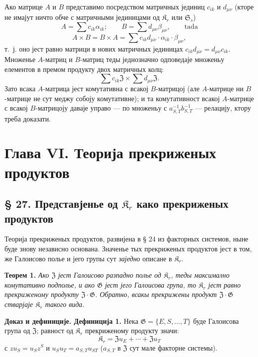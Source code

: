 \documentclass[11pt]{article}
\begin{document}
Ако матрице \(A\) и \(B\) представимо посредством матричных јединиц \(c_{ik}\) и \(d_{\mu\nu}\) (кторе не имајут ничто обче с матричными јединицами од \(\mathfrak K_r\) или \(\mathfrak S_s\))
\[
A=\sum c_{ik}\alpha_{ik};\qquad
B=\sum d_{\mu\nu}\beta_{\mu\nu},\qquad\text{tada}
\]
\[
A\times B=B\times A
=\sum c_{ik}d_{\mu\nu}\cdot\alpha_{ik}\cdot\beta_{\mu\nu},
\]
т.~ј. оно јест равно матрици в нових матричных јединицах
\(c_{ik}d_{\mu\nu}=d_{\mu\nu}c_{ik}\). Множенье \(A\)-матриц и \(B\)-матриц теды једнозначно одповедаје множеньу елементов в премом продукту двох матричных колц:
\[
\sum c_{ik}\mathfrak Z\times\sum d_{\mu\nu}\mathfrak Z.
\]
Зато всака \(A\)-матрица јест комутативна с всакој \(B\)-матрицој (але \(A\)-матрице ни \(B\)-матрице не сут меджу собоју комутативне); и та комутативност всакој \(A\)-матрице с всакој \(B\)-матрицоју даваје управо --- по множеньу с \(a_{S,T}^{-1}b_{S,T}^{-1}\) --- релацију, ктору треба доказати.

\section*{Глава VI. Теорија прекриженых продуктов}\label{kapitel-vi.-theorie-der-verschraenkten-produkte}

\subsection*{§ 27. Представјенье од \(\mathfrak K_r\) како прекриженых продуктов}

Теорија прекриженых продуктов, развијена в § 24 из факторных системов, ныне буде знову независно основана. Значенье тых прекриженых продуктов јест в том, же Галоисово полье и јего групы сут \emph{заједно} описане в \(\mathfrak K_r\).

\noindent\textbf{Теорем 1.} \emph{Ако \(\mathfrak Z\) јест Галоисово разпадно полье од \(\mathfrak K_r\), теды максимално комутативно подполье, и ако \(\mathfrak G\) јест јего Галоисова група, то \(\mathfrak K_r\) јест равно прекриженому продукту \(\mathfrak Z\cdot\mathfrak G\). Обратно, всакы прекрижены продукт \(\mathfrak Z\cdot\mathfrak G\) стварјаје \(\mathfrak K_r\) такого вида.}

\noindent\textbf{Доказ и дефиниције. Дефиниција 1.} Нека \(\mathfrak G=\{E,S,\ldots,T\}\) буде Галоисова група од \(\mathfrak Z\); равност од \(\mathfrak K_r\) прекриженому продукту значи:
\[
\mathfrak K_r=\mathfrak Zu_E+\cdots+\mathfrak Zu_T
\]
с \(zu_S=u_Sz^S\) и \(u_Su_T=a_{S,T}u_{ST}\) (\(a_{S,T}\) в \(\mathfrak Z\) сут мале факторне системы).
\end{document}
